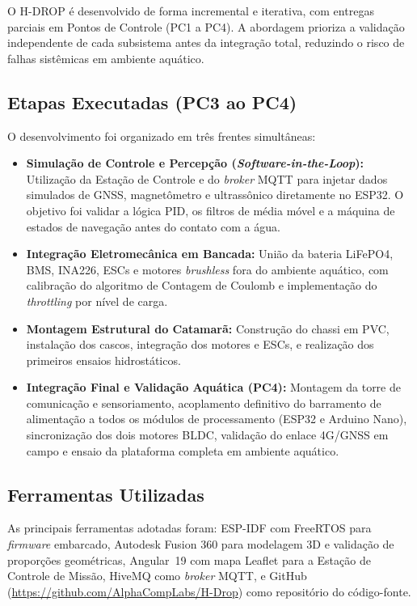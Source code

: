 \documentclass[12pt,a4paper]{article}
\begin{document}
O H-DROP é desenvolvido de forma incremental e iterativa, com entregas parciais em Pontos de Controle (PC1 a PC4). A abordagem prioriza a validação independente de cada subsistema antes da integração total, reduzindo o risco de falhas sistêmicas em ambiente aquático.

\subsection{Etapas Executadas (PC3 ao PC4)}

O desenvolvimento foi organizado em três frentes simultâneas:

\begin{itemize}
\item \textbf{Simulação de Controle e Percepção (\textit{Software-in-the-Loop}):} Utilização da Estação de Controle e do \textit{broker} MQTT para injetar dados simulados de GNSS, magnetômetro e ultrassônico diretamente no ESP32. O objetivo foi validar a lógica PID, os filtros de média móvel e a máquina de estados de navegação antes do contato com a água.
\item \textbf{Integração Eletromecânica em Bancada:} União da bateria LiFePO4, BMS, INA226, ESCs e motores \textit{brushless} fora do ambiente aquático, com calibração do algoritmo de Contagem de Coulomb e implementação do \textit{throttling} por nível de carga.
\item \textbf{Montagem Estrutural do Catamarã:} Construção do chassi em PVC, instalação dos cascos, integração dos motores e ESCs, e realização dos primeiros ensaios hidrostáticos.
\item \textbf{Integração Final e Validação Aquática (PC4):} Montagem da torre de comunicação e sensoriamento, acoplamento definitivo do barramento de alimentação a todos os módulos de processamento (ESP32 e Arduino Nano), sincronização dos dois motores BLDC, validação do enlace 4G/GNSS em campo e ensaio da plataforma completa em ambiente aquático.
\end{itemize}

\subsection{Ferramentas Utilizadas}

As principais ferramentas adotadas foram: ESP-IDF com FreeRTOS para \textit{firmware} embarcado, Autodesk Fusion 360 para modelagem 3D e validação de proporções geométricas, Angular~19 com mapa Leaflet para a Estação de Controle de Missão, HiveMQ como \textit{broker} MQTT, e GitHub (\url{https://github.com/AlphaCompLabs/H-Drop}) como repositório do código-fonte.
\end{document}
